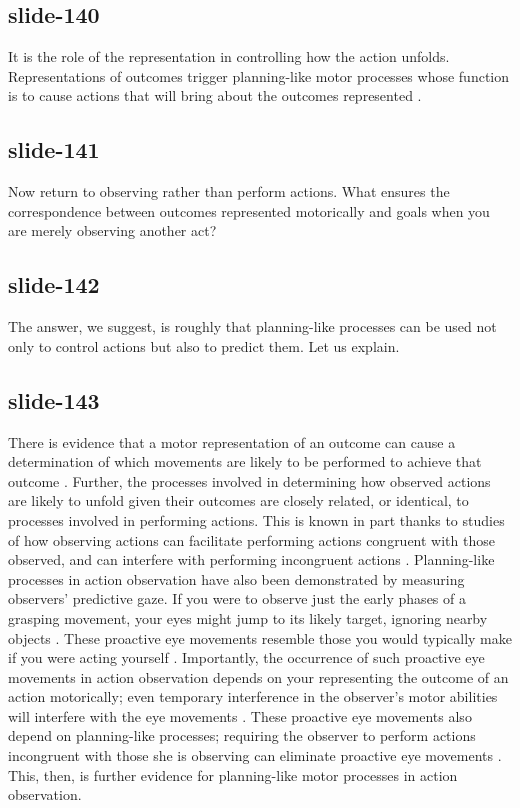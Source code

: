 \documentclass[12pt,\papersize]{extarticle}
\begin{document}
\subsection{slide-140}
It is the role of the
representation in controlling how the action unfolds. Representations of outcomes trigger
planning-like motor processes whose function is to cause actions that will bring about the outcomes
represented \citep{miall:1996_forward,arbib:1985_coordinated,rosenbaum:2012_cognition}.

\subsection{slide-141}
Now return to
observing rather than perform actions. What ensures the correspondence between outcomes represented
motorically and goals when you are merely observing another act?

\subsection{slide-142}
The answer, we suggest, is roughly that planning-like processes can be used not only to control
actions but also to predict them.
Let us explain.

\subsection{slide-143}
There is evidence that a motor representation of an outcome can cause a determination of which movements are likely to be performed to achieve that outcome \citep[see, for instance,][]{kilner:2004_motor, urgesi:2010_simulating}. Further, the processes involved in determining how observed actions are likely to unfold given their outcomes are closely related, or identical, to processes involved in performing actions.
This is known in part thanks to studies of how observing actions can facilitate performing actions congruent with those observed, and can interfere with performing incongruent actions \citep{
	brass:2000_compatibility,
	craighero:2002_hand,
	kilner:2003_interference,
	costantini:2012_does}.
Planning-like processes in action observation have also been demonstrated by measuring observers' predictive gaze.  If you were to observe just the early phases of a grasping movement, your eyes might jump to its likely target, ignoring nearby objects \citep{ambrosini:2011_grasping}. These proactive eye movements resemble those you would typically make if you were acting yourself \citep{Flanagan:2003lm}.
Importantly, the occurrence of such proactive eye movements in action observation depends on your
representing the outcome of an action motorically; even temporary interference in the observer's
motor abilities will interfere with the eye movements \citep{Costantini:2012fk}.
These proactive eye movements also depend on planning-like processes; requiring the observer to
perform actions incongruent with those she is observing can eliminate proactive eye movements
\citep{Costantini:2012uq}. This, then, is further evidence for planning-like motor processes in
action observation.
\end{document}
